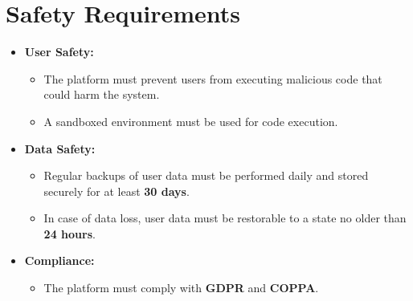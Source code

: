 \documentclass[a4paper, 11pt]{scrreprt}
\begin{document}
\section{Safety Requirements}
\begin{itemize}
    \item \textbf{User Safety:}
    \begin{itemize}
        \item The platform must prevent users from executing malicious code that could harm the system.
        \item A sandboxed environment must be used for code execution.
    \end{itemize}

    \item \textbf{Data Safety:}
    \begin{itemize}
        \item Regular backups of user data must be performed daily and stored securely for at least \textbf{30 days}.
        \item In case of data loss, user data must be restorable to a state no older than \textbf{24 hours}.
    \end{itemize}

    \item \textbf{Compliance:}
    \begin{itemize}
        \item The platform must comply with \textbf{GDPR} and \textbf{COPPA}.
    \end{itemize}
\end{itemize}
\end{document}
